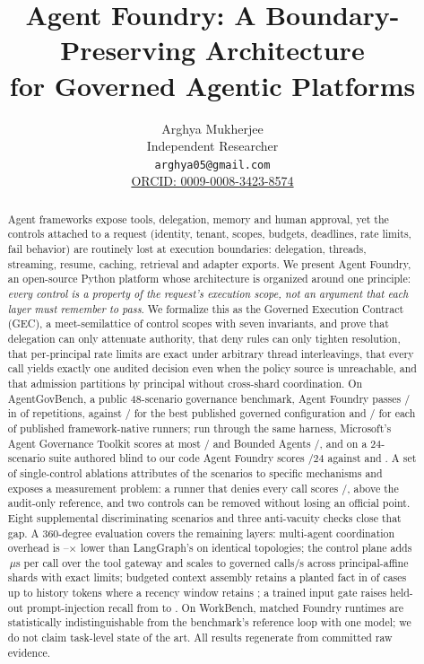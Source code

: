 \documentclass{article}
\title{Agent Foundry: A Boundary-Preserving Architecture\\for Governed Agentic Platforms}
\author{Arghya Mukherjee\\Independent Researcher\\\texttt{arghya05@gmail.com}\\
\href{https://orcid.org/0009-0008-3423-8574}{ORCID: 0009-0008-3423-8574}}
\newcommand{\method}{Agent Foundry}
\newcommand{\gec}{GEC}
\begin{document}
\raggedbottom
\maketitle
\begin{abstract}
Agent frameworks expose tools, delegation, memory and human approval, yet the controls attached to a request (identity, tenant, scopes, budgets, deadlines, rate limits, fail behavior) are routinely lost at execution boundaries: delegation, threads, streaming, resume, caching, retrieval and adapter exports. We present \method{}, an open-source Python platform whose architecture is organized around one principle: \emph{every control is a property of the request's execution scope, not an argument that each layer must remember to pass}. We formalize this as the Governed Execution Contract (\gec{}), a meet-semilattice of control scopes with seven invariants, and prove that delegation can only attenuate authority, that deny rules can only tighten resolution, that per-principal rate limits are exact under arbitrary thread interleavings, that every call yields exactly one audited decision even when the policy source is unreachable, and that admission partitions by principal without cross-shard coordination. On AgentGovBench, a public 48-scenario governance benchmark, \method{} passes \AGBFoundry{}/\AGBTotal{} in \AGBRepeatsPerfect{} of \AGBRepeats{} repetitions, against \AGBBestPublished{}/\AGBTotal{} for the best published governed configuration and \AGBNativeScore{}/\AGBTotal{} for each of \AGBNativeFrameworks{} published framework-native runners; run through the same harness, Microsoft's Agent Governance Toolkit scores at most \AGTBestOfficial{}/\AGBTotal{} and Bounded Agents \APCOfficial{}/\AGBTotal{}, and on a 24-scenario suite authored blind to our code \method{} scores \IndepFoundry{}/24 against \AGTBestIndep{} and \APCIndep{}. A set of \AblationCount{} single-control ablations attributes \AttributedOfficial{} of the \AGBTotal{} scenarios to specific mechanisms and exposes a measurement problem: a runner that denies every call scores \AGBDenyAll{}/\AGBTotal{}, above the audit-only reference, and two controls can be removed without losing an official point. Eight supplemental discriminating scenarios and three anti-vacuity checks close that gap. A 360-degree evaluation covers the remaining layers: multi-agent coordination overhead is \CoordSpeedMin{}--\CoordSpeedMax{}$\times$ lower than LangGraph's on identical topologies; the control plane adds \OvPlaneDelta{}\,$\mu$s per call over the tool gateway and scales to \ShardMaxThroughput{} governed calls/s across \ShardMax{} principal-affine shards with exact limits; budgeted context assembly retains a planted fact in \LCFoundryRetention{} of cases up to \LCMaxHistory{} history tokens where a recency window retains \LCRecencyRetention{}; a trained input gate raises held-out prompt-injection recall from \InjRegexRecall{} to \InjNBRecall{}. On WorkBench, matched Foundry runtimes are statistically indistinguishable from the benchmark's reference loop with one model; we do not claim task-level state of the art. All results regenerate from committed raw evidence.
\end{abstract}
\end{document}
